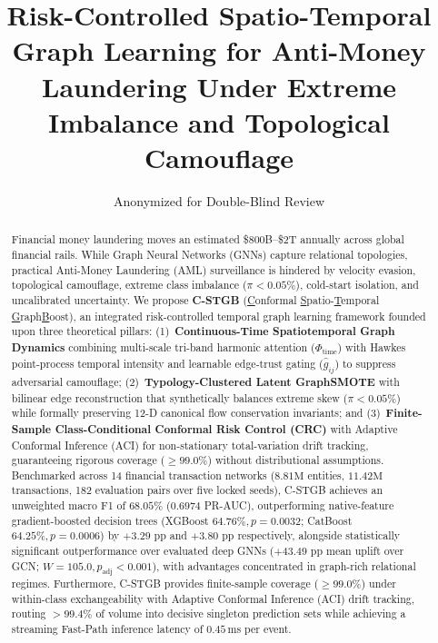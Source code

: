 \documentclass[a4paper,fleqn]{cas-dc}
\begin{document}
\let\WriteBookmarks\relax
\def\floatpagepagefraction{1}
\def\textpagefraction{.001}


\title [mode = title]{Risk-Controlled Spatio-Temporal Graph Learning for Anti-Money Laundering Under Extreme Imbalance and Topological Camouflage}  

\author{Anonymized for Double-Blind Review}

\begin{abstract}
Financial money laundering moves an estimated \$800B--\$2T annually across global financial rails. While Graph Neural Networks (GNNs) capture relational topologies, practical Anti-Money Laundering (AML) surveillance is hindered by velocity evasion, topological camouflage, extreme class imbalance ($\pi < 0.05\%$), cold-start isolation, and uncalibrated uncertainty. We propose \textbf{C-STGB} (\underline{C}onformal \underline{S}patio-\underline{T}emporal \underline{G}raph\underline{B}oost), an integrated risk-controlled temporal graph learning framework founded upon three theoretical pillars: (1)~\textbf{Continuous-Time Spatiotemporal Graph Dynamics} combining multi-scale tri-band harmonic attention ($\Phi_{\text{time}}$) with Hawkes point-process temporal intensity and learnable edge-trust gating ($\hat{g}_{ij}$) to suppress adversarial camouflage; (2)~\textbf{Typology-Clustered Latent GraphSMOTE} with bilinear edge reconstruction that synthetically balances extreme skew ($\pi < 0.05\%$) while formally preserving 12-D canonical flow conservation invariants; and (3)~\textbf{Finite-Sample Class-Conditional Conformal Risk Control (CRC)} with Adaptive Conformal Inference (ACI) for non-stationary total-variation drift tracking, guaranteeing rigorous coverage ($\ge 99.0\%$) without distributional assumptions. Benchmarked across 14 financial transaction networks ($8.81\text{M}$ entities, $11.42\text{M}$ transactions, 182 evaluation pairs over five locked seeds), C-STGB achieves an unweighted macro F1 of $68.05\%$ ($0.6974$ PR-AUC), outperforming native-feature gradient-boosted decision trees (XGBoost $64.76\%, p=0.0032$; CatBoost $64.25\%, p=0.0006$) by $+3.29\text{ pp}$ and $+3.80\text{ pp}$ respectively, alongside statistically significant outperformance over evaluated deep GNNs ($+43.49\text{ pp}$ mean uplift over GCN; $W=105.0, p_{\text{adj}} < 0.001$), with advantages concentrated in graph-rich relational regimes. Furthermore, C-STGB provides finite-sample coverage ($\ge 99.0\%$) under within-class exchangeability with Adaptive Conformal Inference (ACI) drift tracking, routing $>99.4\%$ of volume into decisive singleton prediction sets while achieving a streaming Fast-Path inference latency of $0.45$\,ms per event.
\end{abstract}
\end{document}
